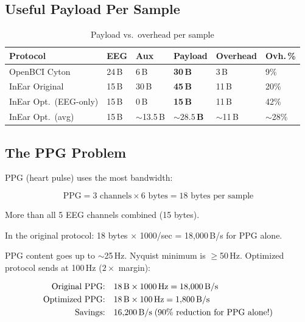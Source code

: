 \documentclass[11pt,a4paper]{article}
\begin{document}
\subsection{Useful Payload Per Sample}

\begin{table}[H]
\centering
\small
\begin{tabular}{|l|R{1.2cm}|R{1.2cm}|R{1.5cm}|R{1.8cm}|R{1.5cm}|}
\hline
\textbf{Protocol} & \textbf{EEG} & \textbf{Aux} & \textbf{Payload} & \textbf{Overhead} & \textbf{Ovh.\,\%} \\\hline
\hline
OpenBCI Cyton & 24\,B & 6\,B & \textbf{30\,B} & 3\,B & 9\% \\
InEar Original & 15\,B & 30\,B & \textbf{45\,B} & 11\,B & 20\% \\
InEar Opt.\ (EEG-only) & 15\,B & 0\,B & \textbf{15\,B} & 11\,B & 42\% \\
InEar Opt.\ (avg) & 15\,B & ${\sim}$13.5\,B & $\mathbf{{\sim}28.5}$\,\textbf{B} & ${\sim}$11\,B & ${\sim}$28\% \\
\hline
\end{tabular}
\caption{Payload vs.\ overhead per sample}
\end{table}

\subsection{The PPG Problem}

PPG (heart pulse) uses the most bandwidth:

\[
\text{PPG} = 3 \text{ channels} \times 6 \text{ bytes} = 18 \text{ bytes per sample}
\]

More than all 5 EEG channels combined (15 bytes).

In the original protocol: 18 bytes $\times$ 1000/sec = 18,000\,B/s for PPG alone.

PPG content goes up to ${\sim}$25\,Hz. Nyquist minimum is $\geq$50\,Hz. Optimized protocol sends at 100\,Hz ($2\times$ margin):

\begin{align}
\text{Original PPG:}\quad & 18 \text{\,B} \times 1000 \text{\,Hz} = 18{,}000 \text{\,B/s} \nonumber\\
\text{Optimized PPG:}\quad & 18 \text{\,B} \times 100 \text{\,Hz} = 1{,}800 \text{\,B/s} \nonumber\\
\text{Savings:}\quad & 16{,}200 \text{\,B/s}\;(90\% \text{ reduction for PPG alone!}) \nonumber
\end{align}
\end{document}
